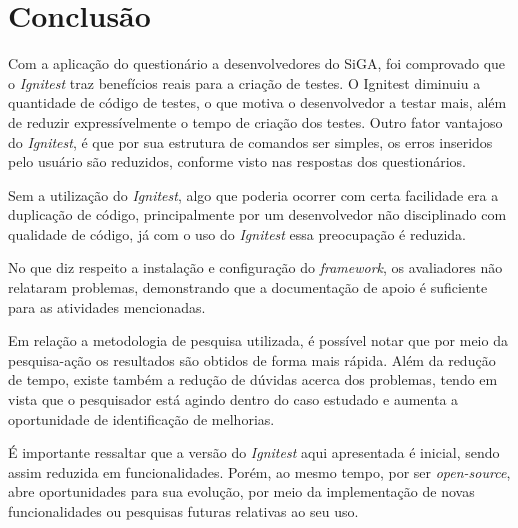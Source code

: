 \chapter{Conclusão}

  Com a aplicação do questionário a desenvolvedores do SiGA, foi comprovado que o \textit{Ignitest} traz benefícios reais para a criação de testes.
  O Ignitest diminuiu a quantidade de código de testes, o que motiva o desenvolvedor a testar mais, além de reduzir expressívelmente o tempo de criação dos testes.
  Outro fator vantajoso do \textit{Ignitest}, é que por sua estrutura de comandos ser simples, os erros inseridos pelo usuário são reduzidos, conforme visto nas respostas dos questionários.
  
  Sem a utilização do \textit{Ignitest}, algo que poderia ocorrer com certa facilidade era a duplicação de código, principalmente por um desenvolvedor não disciplinado com qualidade de código, já com o uso do \textit{Ignitest} essa preocupação é reduzida.
  
  No que diz respeito a instalação e configuração do \textit{framework}, os avaliadores não relataram problemas, demonstrando que a documentação de apoio é suficiente para as atividades mencionadas.
  
  Em relação a metodologia de pesquisa utilizada, é possível notar que por meio da pesquisa-ação os resultados são obtidos de forma mais rápida. Além da redução de tempo, existe também a redução de dúvidas acerca dos problemas, tendo em vista que o pesquisador está agindo dentro do caso estudado e aumenta a oportunidade de identificação de melhorias.
  
  É importante ressaltar que a versão do \textit{Ignitest} aqui apresentada é inicial, sendo assim reduzida em funcionalidades. Porém, ao mesmo tempo, por ser \textit{open-source}, abre oportunidades para sua evolução, por meio da implementação de novas funcionalidades ou pesquisas futuras relativas ao seu uso.